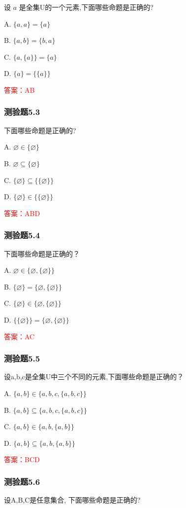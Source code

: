 \documentclass[UTF8, heading=true]{ctexart}
\begin{document}
设 $a$ 是全集U的一个元素,下面哪些命题是正确的?

A. $\{a, a\}=\{a\}$

B. $\{a, b\}=\{b, a\}$

C. $\{a,\{a\}\}=\{a\}$

D. $\{a\}=\{\{a\}\}$

\textcolor{red}{答案：AB}

\subsubsection{测验题5.3}
下面哪些命题是正确的?

A. 
$
\varnothing \in\{\varnothing\}
$

B. 
$
\varnothing \subseteq\{\varnothing\}
$

C. 
$
\{\varnothing\} \subseteq\{\{\varnothing\}\}
$

D. 
$
\{\varnothing\} \in\{\{\varnothing\}\}
$

\textcolor{red}{答案：ABD}


\subsubsection{测验题5.4}
下面哪些命题是正确的？

A. $\varnothing \in\{\varnothing,\{\varnothing\}\}$

B. $\{\varnothing\}=\{\varnothing,\{\varnothing\}\}$

C. $\{\varnothing\} \in\{\varnothing,\{\varnothing\}\}$

D. $\{\{\varnothing\}\}=\{\varnothing,\{\varnothing\}\}$

\textcolor{red}{答案：AC}

\subsubsection{测验题5.5}
设a,b,c是全集U中三个不同的元素,下面哪些命题是正确的？

A. $\{a, b\} \in\{a, b, c,\{a, b, c\}\}$

B. $\{a, b\} \subseteq\{a, b, c,\{a, b, c\}\}$

C. $\{a, b\} \in\{a, b,\{a, b\}\}$

D. $\{a, b\} \subseteq\{a, b,\{a, b\}\}$

\textcolor{red}{答案：BCD}

\subsubsection{测验题5.6}
设A,B,C是任意集合, 下面哪些命题是正确的?
\end{document}
